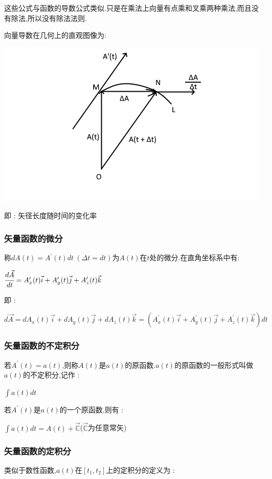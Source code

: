 \documentclass[UTF8,12pt]{ctexbook}
\newcommand{\derivative}{^\prime}
\newcommand{\mathConstant}{\mathbb{C}}
\begin{document}
{{{{      这些公式与函数的导数公式类似.只是在乘法上向量有点乘和叉乘两种乘法,而且没有除法,所以没有除法法则.

      向量导数在几何上的直观图像为:

      \includegraphics{resources/derivativeOfVectorFunction.png}

      即 : 矢径长度随时间的变化率
    }%

    \subsubsection{矢量函数的微分}{
      称$dA(t) = A\derivative(t)dt\ (\Delta t = dt)$为$A(t)$在$t$处的微分.在直角坐标系中有:

      $\cfrac{d\vec{A}}{dt} = A\derivative_x(t)\vec{i} + A\derivative_y(t)\vec{j} + A\derivative_z(t)\vec{k}$

      即 :

      $d\vec{A} = dA_x(t)\vec{i} + dA_y(t)\vec{j} + dA_z(t)\vec{k} = (A\derivative_x(t)\vec{i} + A\derivative_y(t)\vec{j} + A\derivative_z(t)\vec{k})dt$
    }%

    \subsubsection{矢量函数的不定积分}{
      若$A\derivative(t) = a(t)$,则称$A(t)$是$a(t)$的原函数.$a(t)$的原函数的一般形式叫做$a(t)$的不定积分,记作 :

      $\int a(t)dt$

      若$A\derivative(t)$是$a(t)$的一个原函数,则有 :

      $\int a(t)dt = A(t) + \vec{\mathConstant}$\qquad ($\vec{\mathConstant}$为任意常矢)
    }

    \subsubsection{矢量函数的定积分}{
      类似于数性函数,$a(t)$在$[t_1,t_2]$上的定积分的定义为 :

}}}}
\end{document}
